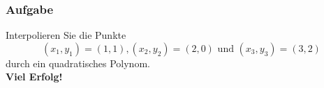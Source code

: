 \documentclass[a4paper,11pt]{scrartcl}
\newcounter{auf}
\newcommand{\Aufgabe}%
        {\addtocounter{auf}{1} \subsubsection*{\rmfamily  Aufgabe \theauf \hspace{1em}} }
\begin{document}
\newpage
\Aufgabe
Interpolieren Sie die Punkte
$$
(x_1,y_1)=(1,1), (x_2,y_2)=(2,0) \text{ und } (x_3,y_3)=(3,2)
$$
durch ein quadratisches Polynom.
%
%
\quad\\

\vfill \hfill \textbf{Viel Erfolg!}
\end{document}

